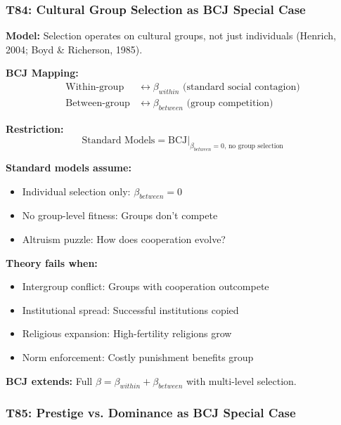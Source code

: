 \subsubsection*{T84: Cultural Group Selection as BCJ Special Case}

\textbf{Model:} Selection operates on cultural groups, not just individuals (Henrich, 2004; Boyd \& Richerson, 1985).

\textbf{BCJ Mapping:}
\begin{align}
\text{Within-group} &\leftrightarrow \beta_{within} \text{ (standard social contagion)} \\
\text{Between-group} &\leftrightarrow \beta_{between} \text{ (group competition)}
\end{align}

\textbf{Restriction:}
\begin{equation}
\text{Standard Models} = \text{BCJ} \big|_{\beta_{between} = 0, \, \text{no group selection}}
\end{equation}

\begin{tcolorbox}[colback=red!5!white, colframe=red!75!black,
    title=Boundary Condition: Where Individual Selection Fails]
\textbf{Standard models assume:}
\begin{itemize}[nosep]
\item Individual selection only: $\beta_{between} = 0$
\item No group-level fitness: Groups don't compete
\item Altruism puzzle: How does cooperation evolve?
\end{itemize}

\textbf{Theory fails when:}
\begin{itemize}[nosep]
\item Intergroup conflict: Groups with cooperation outcompete
\item Institutional spread: Successful institutions copied
\item Religious expansion: High-fertility religions grow
\item Norm enforcement: Costly punishment benefits group
\end{itemize}

\textbf{BCJ extends:} Full $\beta = \beta_{within} + \beta_{between}$ with multi-level selection.
\end{tcolorbox}

\subsubsection*{T85: Prestige vs. Dominance as BCJ Special Case}

